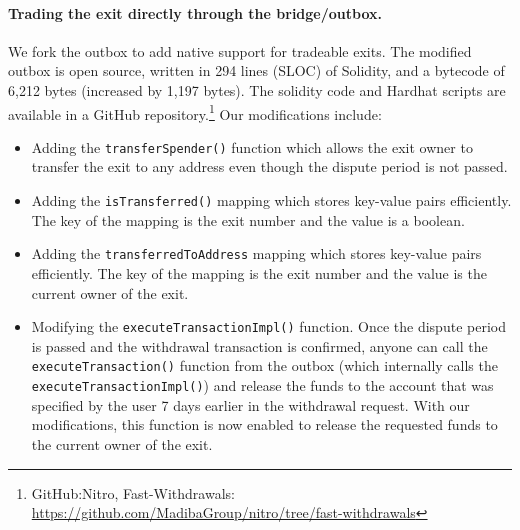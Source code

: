 \paragraph*{Trading the exit directly through the bridge/outbox.} We fork the \arb \nitro outbox to add native support for tradeable exits. The modified outbox is open source, written in 294 lines (SLOC) of Solidity, and a bytecode of 6,212 bytes (increased by 1,197 bytes). The solidity code and Hardhat scripts are available in a GitHub repository.\footnote{GitHub:Nitro, Fast-Withdrawals: \url{https://github.com/MadibaGroup/nitro/tree/fast-withdrawals}} Our modifications include:

\begin{itemize}
\item Adding the \texttt{transferSpender()} function which allows the exit owner to transfer the exit to any \layerone address even though the dispute period is not passed.
\item Adding the \texttt{isTransferred()} mapping which stores key-value pairs efficiently. The key of the mapping is the exit number and the value is a boolean.
\item Adding the \texttt{transferredToAddress} mapping which stores key-value pairs efficiently. The key of the mapping is the exit number and the value is the current owner of the exit.
\item Modifying the \texttt{executeTransactionImpl()} function. Once the dispute period is passed and the withdrawal transaction is confirmed, anyone can call the \texttt{executeTransaction()} function from the outbox (which internally calls the \texttt{executeTransactionImpl()}) and release the funds to the account that was specified by the user 7 days earlier in the \layertwo withdrawal request. With our modifications, this function is now enabled to release the requested funds to the current owner of the exit.
 \end{itemize}
 
